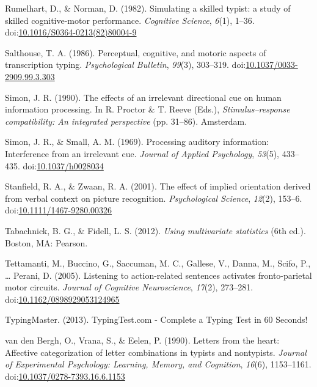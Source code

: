 \documentclass[english,man]{apa6}
\theoremstyle{definition}
\theoremstyle{definition}
\theoremstyle{definition}
\theoremstyle{remark}
\begin{document}
\hypertarget{ref-Rumelhart1982}{}
Rumelhart, D., \& Norman, D. (1982). Simulating a skilled typist: a
study of skilled cognitive-motor performance. \emph{Cognitive Science},
\emph{6}(1), 1--36.
doi:\href{https://doi.org/10.1016/S0364-0213(82)80004-9}{10.1016/S0364-0213(82)80004-9}

\hypertarget{ref-Salthouse1986}{}
Salthouse, T. A. (1986). Perceptual, cognitive, and motoric aspects of
transcription typing. \emph{Psychological Bulletin}, \emph{99}(3),
303--319.
doi:\href{https://doi.org/10.1037/0033-2909.99.3.303}{10.1037/0033-2909.99.3.303}

\hypertarget{ref-Simon1990}{}
Simon, J. R. (1990). The effects of an irrelevant directional cue on
human information processing. In R. Proctor \& T. Reeve (Eds.),
\emph{Stimulus--response compatibility: An integrated perspective} (pp.
31--86). Amsterdam.

\hypertarget{ref-Simon1969}{}
Simon, J. R., \& Small, A. M. (1969). Processing auditory information:
Interference from an irrelevant cue. \emph{Journal of Applied
Psychology}, \emph{53}(5), 433--435.
doi:\href{https://doi.org/10.1037/h0028034}{10.1037/h0028034}

\hypertarget{ref-Stanfield2001}{}
Stanfield, R. A., \& Zwaan, R. A. (2001). The effect of implied
orientation derived from verbal context on picture recognition.
\emph{Psychological Science}, \emph{12}(2), 153--6.
doi:\href{https://doi.org/10.1111/1467-9280.00326}{10.1111/1467-9280.00326}

\hypertarget{ref-Tabachnick2012}{}
Tabachnick, B. G., \& Fidell, L. S. (2012). \emph{Using multivariate
statistics} (6th ed.). Boston, MA: Pearson.

\hypertarget{ref-Tettamanti2005}{}
Tettamanti, M., Buccino, G., Saccuman, M. C., Gallese, V., Danna, M.,
Scifo, P., \ldots{} Perani, D. (2005). Listening to action-related
sentences activates fronto-parietal motor circuits. \emph{Journal of
Cognitive Neuroscience}, \emph{17}(2), 273--281.
doi:\href{https://doi.org/10.1162/0898929053124965}{10.1162/0898929053124965}

\hypertarget{ref-Inc2013}{}
TypingMaster. (2013). TypingTest.com - Complete a Typing Test in 60
Seconds!

\hypertarget{ref-VandenBergh1990}{}
van den Bergh, O., Vrana, S., \& Eelen, P. (1990). Letters from the
heart: Affective categorization of letter combinations in typists and
nontypists. \emph{Journal of Experimental Psychology: Learning, Memory,
and Cognition}, \emph{16}(6), 1153--1161.
doi:\href{https://doi.org/10.1037/0278-7393.16.6.1153}{10.1037/0278-7393.16.6.1153}
\end{document}
